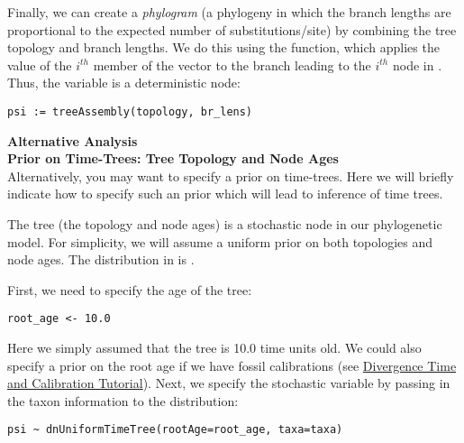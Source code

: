 Finally, we can create a \emph{phylogram} (a phylogeny in which the branch lengths are proportional to the expected number of substitutions/site) by combining the tree topology and branch lengths.
We do this using the  function, which applies the value of the $i^{th}$ member of the  vector to the branch leading to the $i^{th}$ node in . 
Thus, the  variable is a deterministic node: 

{\tt \begin{snugshade*}
\begin{lstlisting}
psi := treeAssembly(topology, br_lens)
\end{lstlisting}
\end{snugshade*}}

\begin{framed}
\textbf{Alternative Analysis\\Prior on Time-Trees: Tree Topology and Node Ages}\\
Alternatively, you may want to specify a prior on time-trees.
Here we will briefly indicate how to specify such an prior which will lead to inference of time trees.

The tree (the topology and node ages) is a stochastic node in our phylogenetic model. 
For simplicity, we will assume a uniform prior on both topologies and node ages.
The distribution in \RevBayes is . 


First, we need to specify the age of the tree:
{\tt \begin{snugshade*}
\begin{lstlisting}
root_age <- 10.0
\end{lstlisting}
\end{snugshade*}}
Here we simply assumed that the tree is 10.0 time units old. 
We could also specify a prior on the root age if we have fossil calibrations (see \href{https://github.com/revbayes/revbayes_tutorial/raw/master/tutorial_TeX/RB_DivergenceTime_Calibration_Tutorial/RB_DivergenceTime_Calibration_Tutorial.pdf}{Divergence Time and Calibration Tutorial}).
Next, we specify the  stochastic variable by passing in the taxon information  to the  distribution:
{\tt \begin{snugshade*}
\begin{lstlisting}
psi ~ dnUniformTimeTree(rootAge=root_age, taxa=taxa)
\end{lstlisting}
\end{snugshade*}}


\end{framed}
